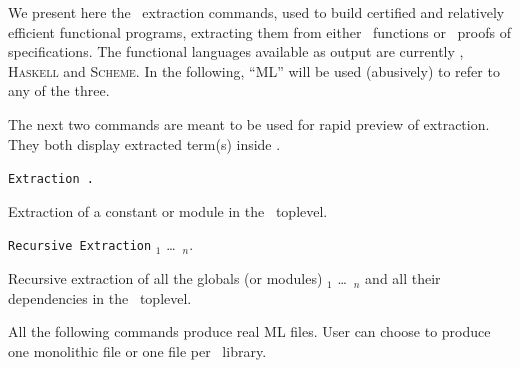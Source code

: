 \label{Extraction}

\noindent We present here the \Coq\ extraction commands, used to build certified
and relatively efficient functional programs, extracting them from
either \Coq\ functions or \Coq\ proofs of specifications. The
functional languages available as output are currently \ocaml{},
\textsc{Haskell} and \textsc{Scheme}.  In the following, ``ML'' will
be used (abusively) to refer to any of the three.



The next two commands are meant to be used for rapid preview of
extraction. They both display extracted term(s) inside \Coq.

\begin{description}
\item {\tt Extraction \qualid{}.} ~\par
  Extraction of a constant or module in the \Coq\ toplevel.

\item {\tt Recursive Extraction} \qualid$_1$ \dots\ \qualid$_n$. ~\par
  Recursive extraction of all the globals (or modules) \qualid$_1$ \dots\
  \qualid$_n$ and all their dependencies in the \Coq\ toplevel.
\end{description}


\noindent All the following commands produce real ML files. User can choose to produce
one monolithic file or one file per \Coq\ library. 

